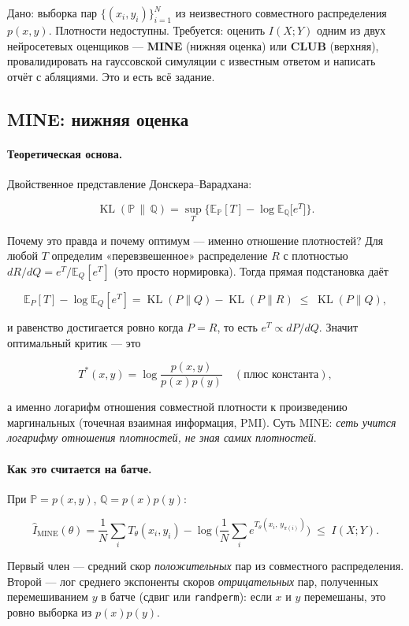 \documentclass[11pt]{article}
\newcommand{\MI}{I(X;Y)}
\newcommand{\KL}{\operatorname{KL}}
\newcommand{\EE}{\mathbb{E}}
\begin{document}
Дано: выборка пар $\{(x_i,y_i)\}_{i=1}^N$ из неизвестного совместного распределения $p(x,y)$. Плотности недоступны. Требуется: оценить $\MI$ одним из двух нейросетевых оценщиков — \textbf{MINE} (нижняя оценка) или \textbf{CLUB} (верхняя), провалидировать на гауссовской симуляции с известным ответом и написать отчёт с абляциями. Это и есть всё задание.

\subsection{MINE: нижняя оценка}

\paragraph{Теоретическая основа.} Двойственное представление Донскера–Варадхана:

\[
\KL(\mathbb{P}\,\|\,\mathbb{Q}) = \sup_T \Big\{ \EE_{\mathbb{P}}[T] - \log \EE_{\mathbb{Q}}\big[e^{T}\big] \Big\}.
\]

Почему это правда и почему оптимум — именно отношение плотностей? Для любой $T$ определим «перевзвешенное» распределение $R$ с плотностью $dR/dQ = e^{T}/\EE_Q[e^T]$ (это просто нормировка). Тогда прямая подстановка даёт

\[
\EE_P[T]-\log\EE_Q[e^T] = \KL(P\|Q) - \KL(P\|R) \;\le\; \KL(P\|Q),
\]

и равенство достигается ровно когда $P=R$, то есть $e^{T}\propto dP/dQ$. Значит оптимальный критик — это

\[
T^*(x,y)=\log\frac{p(x,y)}{p(x)p(y)} \quad(\text{плюс константа}),
\]

а именно логарифм отношения совместной плотности к произведению маргинальных (точечная взаимная информация, PMI). Суть MINE: \emph{сеть учится логарифму отношения плотностей, не зная самих плотностей}.

\paragraph{Как это считается на батче.} При $\mathbb{P}=p(x,y)$, $\mathbb{Q}=p(x)p(y)$:

\[
\hat I_{\text{MINE}}(\theta)
= \frac1N\sum_{i} T_\theta(x_i, y_i)
- \log\Big(\frac1N\sum_{i} e^{T_\theta(x_i,\, y_{\pi(i)})}\Big)
\;\le\; \MI.
\]

Первый член — средний скор \emph{положительных} пар из совместного распределения. Второй — лог среднего экспоненты скоров \emph{отрицательных} пар, полученных перемешиванием $y$ в батче (сдвиг или \texttt{randperm}): если $x$ и $y$ перемешаны, это ровно выборка из $p(x)p(y)$.
\end{document}
